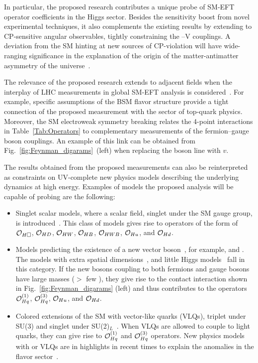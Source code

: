 \documentclass[a4paper,11pt]{article}
\renewcommand{\PV}{{{{V}}}\xspace}
\begin{document}
In particular, the proposed research contributes a unique probe of SM-EFT operator coefficients in the Higgs sector.
Besides the sensitivity boost from novel experimental techniques, it also complements the existing results by extending to CP-sensitive angular observables, tightly constraining the \PH--\PV couplings.
A deviation from the SM hinting at new sources of CP-violation will have wide-ranging significance in the explanation of the origin of the matter-antimatter asymmetry of the universe~\cite{Cohen:1997ac,Damgaard:2015con,Grzadkowski:2018nbc}.

The relevance of the proposed research extends to adjacent fields when the interplay of LHC measurements in global SM-EFT analysis is considered~\cite{Ellis:2018gqa,Ethier:2021bye}.
For example, specific assumptions of the BSM flavor structure provide a tight connection of the proposed measurement with the sector of top-quark physics. 
Moreover, the SM electroweak symmetry breaking relates the 4-point interactions in Table~\ref{Tab:Operators} to complementary measurements of the fermion--gauge boson couplings. 
An example of this link can be obtained from Fig.~\ref{fig:Feynman_digarams}~(left) when replacing the \PH boson line with $v$.

The results obtained from the proposed measurements can also be reinterpreted as constraints on UV-complete new physics models describing the underlying dynamics at high energy.
Examples of models the proposed analysis will be capable of probing are the following:
\begin{itemize}

\item Singlet scalar models, where a scalar field, singlet under the SM gauge group, is introduced~\cite{deBlas:2014mba,Profumo:2014opa}. This class of models gives rise to operators of the form of ${\cal O}_{H\square}$, ${\cal O}_{HD}$, ${\cal O}_{HW}$, ${\cal O}_{HB}$, ${\cal O}_{HWB}$, ${\cal O}_{Hu}$, and ${\cal O}_{Hd}$.

\item Models predicting the existence of a new vector boson~\cite{delAguila:2010mx}, for example, \PZprime and \PWprime. 
The models with extra spatial dimensions~\cite{Burdman:2006gy}, and little Higgs models~\cite{PhysRevD.10.275} fall in this category.
If the new bosons coupling to both fermions and gauge bosons have large masses ($>$ few \TeV), they give rise to the contact interaction shown in Fig.~\ref{fig:Feynman_digarams} (left) and thus contributes to the operators  ${\cal O}^{(1)}_{Hq}$, ${\cal O}^{(3)}_{Hq}$, ${\cal O}_{Hu}$, and ${\cal O}_{Hd}$. 

\item Colored extensions of the SM with vector-like quarks (VLQs), triplet under SU(3) and singlet under SU(2)$_L$~\cite{delAguila:2000aa,Dawson:2012di}. 
When VLQs are allowed to couple to light quarks, they can give rise to ${\cal O}^{(1)}_{Hq}$ and ${\cal O}^{(3)}_{Hq}$ operators.
New physics models with \PZprime or VLQs are in highlights in recent times to explain the anomalies in the flavor sector~\cite{Kumar:2018kmr,Bhattacharya:2016mcc,Buttazzo:2017ixm}.%

\end{itemize}
\end{document}
